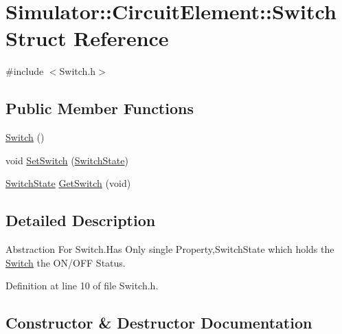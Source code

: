 \hypertarget{struct_simulator_1_1_circuit_element_1_1_switch}{}\section{Simulator\+:\+:Circuit\+Element\+:\+:Switch Struct Reference}
\label{struct_simulator_1_1_circuit_element_1_1_switch}


{\ttfamily \#include $<$Switch.\+h$>$}

\subsection*{Public Member Functions}
\begin{DoxyCompactItemize}
\item 
\hyperlink{struct_simulator_1_1_circuit_element_1_1_switch_af62956da54c29a1ea2a21b37b3e87715}{Switch} ()
\item 
void \hyperlink{struct_simulator_1_1_circuit_element_1_1_switch_a1ee4b24e6f79e64e22384290130d22f4}{Set\+Switch} (\hyperlink{namespace_simulator_1_1_circuit_element_a6774cddc1f4df8530170b06473f198d1}{Switch\+State})
\item 
\hyperlink{namespace_simulator_1_1_circuit_element_a6774cddc1f4df8530170b06473f198d1}{Switch\+State} \hyperlink{struct_simulator_1_1_circuit_element_1_1_switch_a3814e472c0a42be48807cd70f065f5c8}{Get\+Switch} (void)
\end{DoxyCompactItemize}


\subsection{Detailed Description}
Abstraction For Switch.\+Has Only single Property,Switch\+State which holds the \hyperlink{struct_simulator_1_1_circuit_element_1_1_switch}{Switch} the O\+N/\+O\+F\+F Status. 

Definition at line 10 of file Switch.\+h.



\subsection{Constructor \& Destructor Documentation}
\hypertarget{struct_simulator_1_1_circuit_element_1_1_switch_af62956da54c29a1ea2a21b37b3e87715}{}
